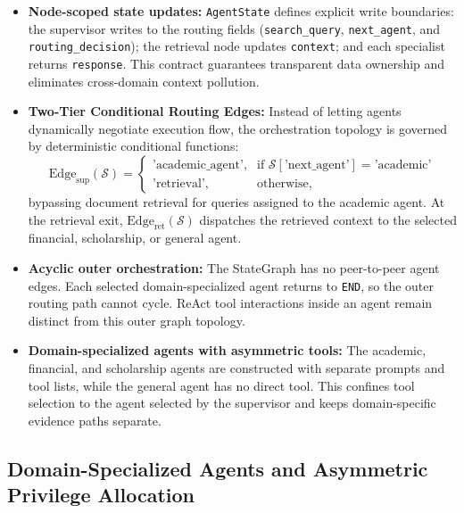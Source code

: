 \begin{itemize}
    \item \textbf{Node-scoped state updates:} \texttt{AgentState} defines explicit write boundaries: the supervisor writes to the routing fields (\texttt{search\_query}, \texttt{next\_agent}, and \texttt{routing\_decision}); the retrieval node updates \texttt{context}; and each specialist returns \texttt{response}. This contract guarantees transparent data ownership and eliminates cross-domain context pollution.
    
    \item \textbf{Two-Tier Conditional Routing Edges:} Instead of letting agents dynamically negotiate execution flow, the orchestration topology is governed by deterministic conditional functions:
    \begin{equation}
        \mathrm{Edge}_{\text{sup}}(\mathcal{S}) = \begin{cases}
            \text{'academic\_agent'}, & \text{if } \mathcal{S}[\text{'next\_agent'}] = \text{'academic'} \\
            \text{'retrieval'}, & \text{otherwise},
        \end{cases}
    \end{equation}
    bypassing document retrieval for queries assigned to the academic agent. At the retrieval exit, $\mathrm{Edge}_{\text{ret}}(\mathcal{S})$ dispatches the retrieved context to the selected financial, scholarship, or general agent.
    
    \item \textbf{Acyclic outer orchestration:} The StateGraph has no peer-to-peer agent edges. Each selected domain-specialized agent returns to \texttt{END}, so the outer routing path cannot cycle. ReAct tool interactions inside an agent remain distinct from this outer graph topology.
    
    \item \textbf{Domain-specialized agents with asymmetric tools:} The academic, financial, and scholarship agents are constructed with separate prompts and tool lists, while the general agent has no direct tool. This confines tool selection to the agent selected by the supervisor and keeps domain-specific evidence paths separate.
\end{itemize}

\FloatBarrier
\subsection{Domain-Specialized Agents and Asymmetric Privilege Allocation}
\label{sec:agents}

